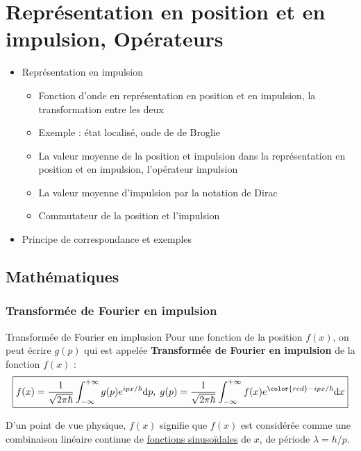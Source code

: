 \chapter{Représentation en position et en impulsion, Opérateurs}

\begin{tcolorbox}
  \begin{itemize}

    \item Représentation en impulsion
    \begin{itemize}

        \item Fonction d’onde en représentation en position et en impulsion, la transformation entre les deux 
        \item Exemple : état localisé, onde de de Broglie 
        \item La valeur moyenne de la position et impulsion dans la représentation en position et en impulsion, l’opérateur impulsion 
        \item La valeur moyenne d’impulsion par la notation de Dirac 
        \item Commutateur de la position et l’impulsion
    \end{itemize}
   \item Principe de correspondance et exemples

  \end{itemize}
\end{tcolorbox}
\section{Mathématiques}
\subsection{Transformée de Fourier en impulsion}

\begin{Definition}[colbacktitle=red!75!black]{Transformée de Fourier en implusion}{}
Pour une fonction de la position $f(x)$, on peut écrire $g(p)$ qui est appelée \textbf{Transformée de Fourier en impulsion} de la fonction $f(x)$ :
  \[
    \boxed{f(x) = \frac{1}{\sqrt{2 \pi \hbar}} \int_{- \infty} ^{+ \infty} g(p) e ^{ipx / \hbar} \mathrm{d}p, \; g(p) = \frac{1}{\sqrt{2 \pi \hbar}} \int_{- \infty} ^{+ \infty} f(x)e ^{{\color{red} - }ipx / \hbar} \mathrm{d}x}
  \]

  D'un point de vue physique, $f(x)$ signifie que $f(x)$ est considérée comme une combinaison linéaire continue de \underline{fonctions sinusoïdales} de $x$, de période $\lambda = h/p$.
\end{Definition}

